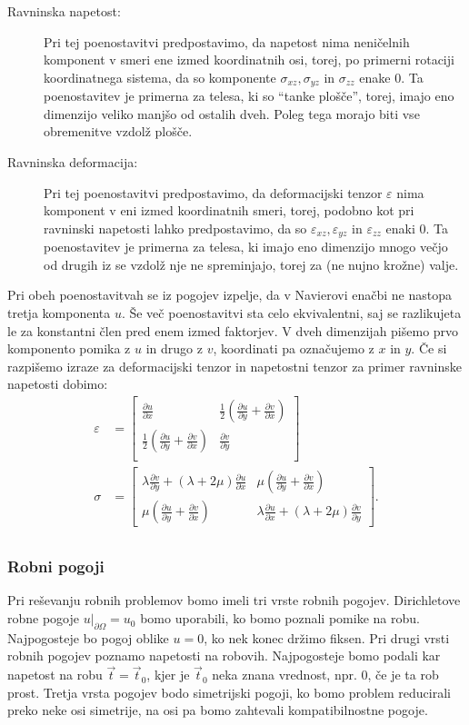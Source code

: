 \documentclass[12pt,a4paper]{article}
\theoremstyle{definition} %
\theoremstyle{plain} %
\numberwithin{equation}{section}
\newcommand{\eps}{\varepsilon}
\newcommand{\dpar}[2]{\ensuremath{\frac{\partial #1}{\partial #2}}}
\newcommand{\vt}{\vec{t}}
\newcommand{\ts}{\sigma}
\begin{document}
\begin{description}
  \item[Ravninska napetost:]
Pri tej poenostavitvi predpostavimo, da napetost nima neničelnih komponent v
smeri ene izmed koordinatnih osi, torej, po primerni rotaciji koordinatnega
sistema, da so komponente $\ts_{xz}, \ts_{yz}$ in $\ts_{zz}$ enake 0. Ta
poenostavitev je primerna za telesa, ki so ``tanke plošče'', torej, imajo eno
dimenzijo veliko manjšo od ostalih dveh. Poleg tega morajo biti vse obremenitve
vzdolž plošče.
  \item[Ravninska deformacija:]
Pri tej poenostavitvi predpostavimo, da deformacijski tenzor $\eps$ nima
komponent v eni izmed koordinatnih smeri, torej, podobno kot pri ravninski
napetosti lahko predpostavimo, da so $\eps_{xz}, \eps_{yz}$ in $\eps_{zz}$ enaki
0. Ta poenostavitev je primerna za telesa, ki imajo eno dimenzijo mnogo večjo od
drugih iz se vzdolž nje ne spreminjajo, torej za (ne nujno krožne) valje.
\end{description}

Pri obeh poenostavitvah se iz pogojev izpelje, da v Navierovi enačbi ne nastopa
tretja komponenta $u$. Še več poenostavitvi sta celo ekvivalentni, saj se
razlikujeta le za konstantni člen pred enem izmed faktorjev. V dveh dimenzijah
pišemo prvo komponento pomika z $u$ in drugo z $v$, koordinati pa označujemo z
$x$ in $y$. Če si razpišemo izraze za deformacijski tenzor in napetostni tenzor
za primer ravninske napetosti dobimo:
\begin{align*}
  \eps &=
  \begin{bmatrix}
    \dpar{u}{x} & \frac12(\dpar{u}{y} + \dpar{v}{x}) \\
    \frac12(\dpar{u}{y} + \dpar{v}{x}) & \dpar{v}{y} \\
  \end{bmatrix}
  \\
  \ts &=
  \begin{bmatrix}
    \lambda \dpar{v}{y} + (\lambda+2\mu) \dpar{u}{x} &
    \mu(\dpar{u}{y} + \dpar{v}{x}) \\
    \mu(\dpar{u}{y} + \dpar{v}{x}) &
    \lambda \dpar{u}{x} + (\lambda+2\mu) \dpar{v}{y}
  \end{bmatrix}.
  \\
\end{align*}

\subsubsection{Robni pogoji}
Pri reševanju robnih problemov bomo imeli tri vrste robnih pogojev. Dirichletove
robne pogoje $u|_{\partial \Omega} = u_0$ bomo uporabili, ko bomo poznali
pomike na robu. Najpogosteje bo pogoj oblike $u = 0$, ko nek konec držimo
fiksen. Pri drugi vrsti robnih pogojev poznamo napetosti na robovih.
Najpogosteje bomo podali kar napetost na robu $\vt = \vt_0$, kjer je $\vt_0$
neka znana vrednost, npr. 0, če je ta rob prost. Tretja vrsta pogojev bodo
simetrijski pogoji, ko bomo problem reducirali preko neke osi simetrije, na osi
pa bomo zahtevali kompatibilnostne pogoje.
\end{document}
